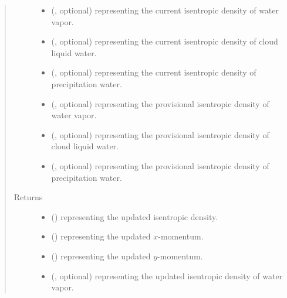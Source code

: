 \documentclass[letterpaper,10pt,english]{sphinxmanual}
\begin{document}
\begin{fulllineitems}
\begin{fulllineitems}
\begin{quote}
\begin{description}
\begin{itemize}
\item {} 
 (, optional) \textendash{}  representing the current isentropic density of water vapor.

\item {} 
 (, optional) \textendash{}  representing the current isentropic density of cloud liquid water.

\item {} 
 (, optional) \textendash{}  representing the current isentropic density of precipitation water.

\item {} 
 (, optional) \textendash{}  representing the provisional isentropic density of water vapor.

\item {} 
 (, optional) \textendash{}  representing the provisional isentropic density of cloud liquid water.

\item {} 
 (, optional) \textendash{}  representing the provisional isentropic density of precipitation water.

\end{itemize}

\item[{Returns}] \leavevmode
\begin{itemize}
\item {} 
 () \textendash{}  representing the updated isentropic density.

\item {} 
 () \textendash{}  representing the updated \(x\)-momentum.

\item {} 
 () \textendash{}  representing the updated \(y\)-momentum.

\item {} 
 (, optional) \textendash{}  representing the updated isentropic density of water vapor.


\end{itemize}
\end{description}
\end{quote}
\end{fulllineitems}
\end{fulllineitems}
\end{document}
